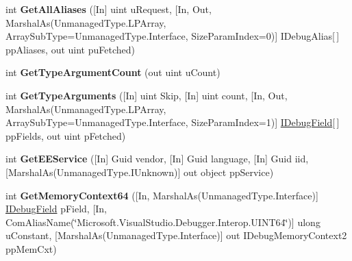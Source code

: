 \begin{DoxyCompactItemize}
\item 
\hypertarget{interface_microsoft_1_1_visual_studio_1_1_debugger_1_1_interop_e_e_1_1_i_debug_binder3_a171a33aaff0aef4b7bf901297fca4a5c}{int {\bfseries Get\+All\+Aliases} (\mbox{[}In\mbox{]} uint u\+Request, \mbox{[}In, Out, Marshal\+As(Unmanaged\+Type.\+L\+P\+Array, Array\+Sub\+Type=Unmanaged\+Type.\+Interface, Size\+Param\+Index=0)\mbox{]} I\+Debug\+Alias\mbox{[}$\,$\mbox{]} pp\+Aliases, out uint pu\+Fetched)}\label{interface_microsoft_1_1_visual_studio_1_1_debugger_1_1_interop_e_e_1_1_i_debug_binder3_a171a33aaff0aef4b7bf901297fca4a5c}

\item 
\hypertarget{interface_microsoft_1_1_visual_studio_1_1_debugger_1_1_interop_e_e_1_1_i_debug_binder3_a1d1b9422a5da14562027061e67928cab}{int {\bfseries Get\+Type\+Argument\+Count} (out uint u\+Count)}\label{interface_microsoft_1_1_visual_studio_1_1_debugger_1_1_interop_e_e_1_1_i_debug_binder3_a1d1b9422a5da14562027061e67928cab}

\item 
\hypertarget{interface_microsoft_1_1_visual_studio_1_1_debugger_1_1_interop_e_e_1_1_i_debug_binder3_ac0e0c523069201bd4d50336797116d94}{int {\bfseries Get\+Type\+Arguments} (\mbox{[}In\mbox{]} uint Skip, \mbox{[}In\mbox{]} uint count, \mbox{[}In, Out, Marshal\+As(Unmanaged\+Type.\+L\+P\+Array, Array\+Sub\+Type=Unmanaged\+Type.\+Interface, Size\+Param\+Index=1)\mbox{]} \hyperlink{interface_microsoft_1_1_visual_studio_1_1_debugger_1_1_interop_e_e_1_1_i_debug_field}{I\+Debug\+Field}\mbox{[}$\,$\mbox{]} pp\+Fields, out uint p\+Fetched)}\label{interface_microsoft_1_1_visual_studio_1_1_debugger_1_1_interop_e_e_1_1_i_debug_binder3_ac0e0c523069201bd4d50336797116d94}

\item 
\hypertarget{interface_microsoft_1_1_visual_studio_1_1_debugger_1_1_interop_e_e_1_1_i_debug_binder3_ac11fbc594de2d36253d81e0822773aa0}{int {\bfseries Get\+E\+E\+Service} (\mbox{[}In\mbox{]} Guid vendor, \mbox{[}In\mbox{]} Guid language, \mbox{[}In\mbox{]} Guid iid, \mbox{[}Marshal\+As(Unmanaged\+Type.\+I\+Unknown)\mbox{]} out object pp\+Service)}\label{interface_microsoft_1_1_visual_studio_1_1_debugger_1_1_interop_e_e_1_1_i_debug_binder3_ac11fbc594de2d36253d81e0822773aa0}

\item 
\hypertarget{interface_microsoft_1_1_visual_studio_1_1_debugger_1_1_interop_e_e_1_1_i_debug_binder3_a7eaca6b9e6f5ce54ccb6c5c35ef45eef}{int {\bfseries Get\+Memory\+Context64} (\mbox{[}In, Marshal\+As(Unmanaged\+Type.\+Interface)\mbox{]} \hyperlink{interface_microsoft_1_1_visual_studio_1_1_debugger_1_1_interop_e_e_1_1_i_debug_field}{I\+Debug\+Field} p\+Field, \mbox{[}In, Com\+Alias\+Name(\char`\"{}Microsoft.\+Visual\+Studio.\+Debugger.\+Interop.\+U\+I\+N\+T64\char`\"{})\mbox{]} ulong u\+Constant, \mbox{[}Marshal\+As(Unmanaged\+Type.\+Interface)\mbox{]} out I\+Debug\+Memory\+Context2 pp\+Mem\+Cxt)}\label{interface_microsoft_1_1_visual_studio_1_1_debugger_1_1_interop_e_e_1_1_i_debug_binder3_a7eaca6b9e6f5ce54ccb6c5c35ef45eef}

\end{DoxyCompactItemize}


